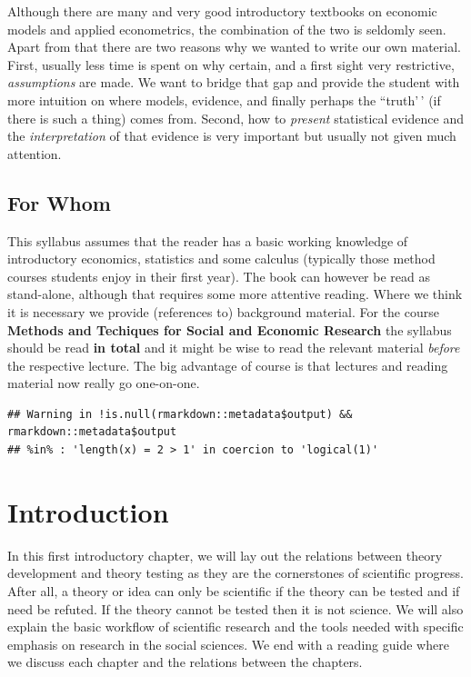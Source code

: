 \documentclass[
]{book}
\begin{document}
Although there are many and very good introductory textbooks on economic models and applied econometrics, the combination of the two is seldomly seen. Apart from that there are two reasons why we wanted to write our own material. First, usually less time is spent on why certain, and a first sight very restrictive, \emph{assumptions} are made. We want to bridge that gap and provide the student with more intuition on where models, evidence, and finally perhaps the ``truth'\,' (if there is such a thing) comes from. Second, how to \emph{present} statistical evidence and the \emph{interpretation} of that evidence is very important but usually not given much attention.

\hypertarget{for-whom}{%
\section*{For Whom}\label{for-whom}}

This syllabus assumes that the reader has a basic working knowledge of introductory economics, statistics and some calculus (typically those method courses students enjoy in their first year). The book can however be read as stand-alone, although that requires some more attentive reading. Where we think it is necessary we provide (references to) background material. For the course \textbf{Methods and Techiques for Social and Economic Research} the syllabus should be read \textbf{in total} and it might be wise to read the relevant material \emph{before} the respective lecture. The big advantage of course is that lectures and reading material now really go one-on-one.

\begin{verbatim}
## Warning in !is.null(rmarkdown::metadata$output) && rmarkdown::metadata$output
## %in% : 'length(x) = 2 > 1' in coercion to 'logical(1)'
\end{verbatim}

\hypertarget{introduction}{%
\chapter{Introduction}\label{introduction}}

In this first introductory chapter, we will lay out the relations between theory development and theory testing as they are the cornerstones of scientific progress. After all, a theory or idea can only be scientific if the theory can be tested and if need be refuted. If the theory cannot be tested then it is not science. We will also explain the basic workflow of scientific research and the tools needed with specific emphasis on research in the social sciences. We end with a reading guide where we discuss each chapter and the relations between the chapters.
\end{document}

